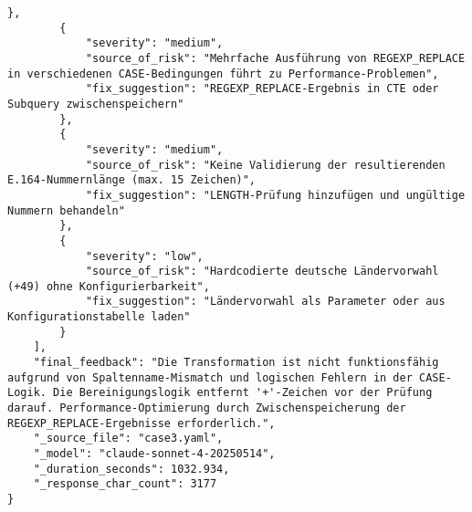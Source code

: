 \begin{lstlisting}[caption={Ausgabe: Claude Sonnet 4 Anwendungsfall 3 Hauptdurchlauf},label={claude_case3_prompt1}]
        },
        {
            "severity": "medium",
            "source_of_risk": "Mehrfache Ausführung von REGEXP_REPLACE in verschiedenen CASE-Bedingungen führt zu Performance-Problemen",
            "fix_suggestion": "REGEXP_REPLACE-Ergebnis in CTE oder Subquery zwischenspeichern"
        },
        {
            "severity": "medium",
            "source_of_risk": "Keine Validierung der resultierenden E.164-Nummernlänge (max. 15 Zeichen)",
            "fix_suggestion": "LENGTH-Prüfung hinzufügen und ungültige Nummern behandeln"
        },
        {
            "severity": "low",
            "source_of_risk": "Hardcodierte deutsche Ländervorwahl (+49) ohne Konfigurierbarkeit",
            "fix_suggestion": "Ländervorwahl als Parameter oder aus Konfigurationstabelle laden"
        }
    ],
    "final_feedback": "Die Transformation ist nicht funktionsfähig aufgrund von Spaltenname-Mismatch und logischen Fehlern in der CASE-Logik. Die Bereinigungslogik entfernt '+'-Zeichen vor der Prüfung darauf. Performance-Optimierung durch Zwischenspeicherung der REGEXP_REPLACE-Ergebnisse erforderlich.",
    "_source_file": "case3.yaml",
    "_model": "claude-sonnet-4-20250514",
    "_duration_seconds": 1032.934,
    "_response_char_count": 3177
}
\end{lstlisting}

